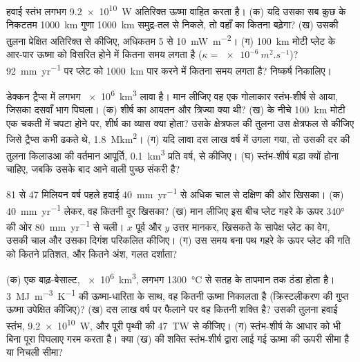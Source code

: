 \begin{exercise}[$\star\star$]\label{exo:b1:hotspots:9}
हवाई स्तंभ लगभग \qty{9.2e10}{W} अतिरिक्त ऊष्मा वाहित करता है। (क) यदि उसका सब कुछ  के निकटतम \qty{1000}{km} गुणा \qty{1000}{km} समुद्र-तल से निकले, तो वहाँ का  कितना बढ़ेगा? (ख) उसकी तुलना प्रेक्षित अतिरिक्त से कीजिए, अधिकतम 5 से \qty{10}{mW.m^{-2}}। (ग) \qty{100}{km} मोटी प्लेट के आर-पार ऊष्मा को विसरित होने में कितना समय लगता है ($\kappa = \qty{e-6}{m^2.s^{-1}}$)? \qty{92}{mm.yr^{-1}} पर प्लेट को \qty{1000}{km} पार करने में कितना समय लगता है? निष्कर्ष निकालिए।
\end{exercise}

\begin{exercise}[$\star\star\star$]\label{exo:b1:hotspots:10}
डेक्कन ट्रैप्स में लगभग \qty{e6}{km^3} लावा है। मान लीजिए वह एक गोलाकार स्तंभ-शीर्ष से आया, जिसका दसवाँ भाग पिघला। (क) शीर्ष का आयतन और त्रिज्या क्या थी? (ख)  के नीचे \qty{100}{km} मोटी एक चकती में चपटा होने पर, शीर्ष का व्यास क्या होता? उसके क्षेत्रफल की तुलना उस क्षेत्रफल से कीजिए जिसे ट्रैप्स कभी ढकते थे, \qty{1.8}{\mega km^2}। (ग) यदि लावा दस लाख वर्ष में उगला गया, तो उसकी दर की तुलना किलाउआ की वर्तमान आपूर्ति, \qty{0.1}{km^3} प्रति वर्ष, से कीजिए। (घ) स्तंभ-शीर्ष बड़ा क्यों होना चाहिए, जबकि उसके बाद आने वाली पुच्छ संकरी है?
\end{exercise}

\begin{exercise}[$\star\star\star$]\label{exo:b1:hotspots:11}
81 से 47 मिलियन वर्ष पहले हवाई  \qty{40}{mm.yr^{-1}} से अधिक चाल से दक्षिण की ओर खिसका। (क) \qty{40}{mm.yr^{-1}} लेकर, वह कितनी दूर खिसका? (ख) मान लीजिए इस बीच प्लेट गहरे  के ऊपर \ang{340} की ओर \qty{80}{mm.yr^{-1}} से चली। $x$ पूर्व और $y$ उत्तर मानकर, खिसकते  के सापेक्ष प्लेट का वेग, उसकी चाल और उसका दिगंश परिकलित कीजिए। (ग) उस समय बना पथ गहरे  के ऊपर प्लेट की गति को कितने प्रतिशत, और कितने अंश, गलत दर्शाता?
\end{exercise}

\begin{exercise}[$\star\star\star$]\label{exo:b1:hotspots:12}
(क) एक बाढ़-बेसाल्ट, \qty{e6}{km^3}, लगभग \qty{1300}{\celsius} से सतह के तापमान तक ठंडा होता है। \qty{3}{MJ.m^{-3}.K^{-1}} की ऊष्मा-धारिता के साथ, वह कितनी ऊष्मा निकालता है (क्रिस्टलीकरण की गुप्त ऊष्मा उपेक्षित कीजिए)? (ख) दस लाख वर्ष पर फैलाने पर वह कितनी शक्ति है? उसकी तुलना हवाई स्तंभ, \qty{9.2e10}{W}, और पूरी पृथ्वी की \qty{47}{TW} से कीजिए। (ग) स्तंभ-शीर्ष  के आधार को भी बिना पूरा पिघलाए गरम करता है। क्या (ख) की शक्ति स्तंभ-शीर्ष द्वारा लाई गई ऊष्मा की ऊपरी सीमा है या निचली सीमा?
\end{exercise}

